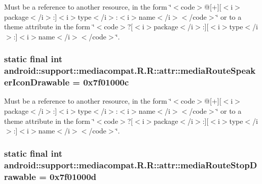 Must be a reference to another resource, in the form \char`\"{}$<$code$>$@\mbox{[}+\mbox{]}\mbox{[}$<$i$>$package$<$/i$>$:\mbox{]}$<$i$>$type$<$/i$>$:$<$i$>$name$<$/i$>$$<$/code$>$\char`\"{} or to a theme attribute in the form \char`\"{}$<$code$>$?\mbox{[}$<$i$>$package$<$/i$>$:\mbox{]}\mbox{[}$<$i$>$type$<$/i$>$:\mbox{]}$<$i$>$name$<$/i$>$$<$/code$>$\char`\"{}. \hypertarget{classandroid_1_1support_1_1mediacompat_1_1_r_1_1attr_0dbac20b8a410e542755b2c0b796bf60}{
\subsubsection[{mediaRouteSpeakerIconDrawable}]{\setlength{\rightskip}{0pt plus 5cm}static final int android::support::mediacompat.R.R::attr::mediaRouteSpeakerIconDrawable = 0x7f01000c}}
\label{classandroid_1_1support_1_1mediacompat_1_1_r_1_1attr_0dbac20b8a410e542755b2c0b796bf60}


Must be a reference to another resource, in the form \char`\"{}$<$code$>$@\mbox{[}+\mbox{]}\mbox{[}$<$i$>$package$<$/i$>$:\mbox{]}$<$i$>$type$<$/i$>$:$<$i$>$name$<$/i$>$$<$/code$>$\char`\"{} or to a theme attribute in the form \char`\"{}$<$code$>$?\mbox{[}$<$i$>$package$<$/i$>$:\mbox{]}\mbox{[}$<$i$>$type$<$/i$>$:\mbox{]}$<$i$>$name$<$/i$>$$<$/code$>$\char`\"{}. \hypertarget{classandroid_1_1support_1_1mediacompat_1_1_r_1_1attr_9b04ce847401a35fdcc5b077ce9155f7}{
\subsubsection[{mediaRouteStopDrawable}]{\setlength{\rightskip}{0pt plus 5cm}static final int android::support::mediacompat.R.R::attr::mediaRouteStopDrawable = 0x7f01000d}}
\label{classandroid_1_1support_1_1mediacompat_1_1_r_1_1attr_9b04ce847401a35fdcc5b077ce9155f7}


